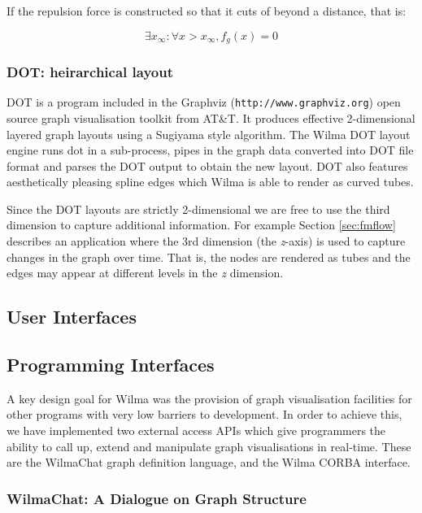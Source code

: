 \documentclass[runningheads]{cl2emult}
\newcommand{\url}[1]{{\small{\tt #1}}}
\begin{document}
If the repulsion force is constructed so that it cuts of beyond a distance,
that is:

\begin{equation}
\exists x_\infty : \forall x > x_\infty, f_g(x) = 0
\end{equation}

\subsubsection{DOT: heirarchical layout}
DOT is a program included in the Graphviz
(\url{http://www.graphviz.org}) open source graph visualisation
toolkit from AT\&T.  It produces effective 2-dimensional layered graph
layouts using a Sugiyama\cite{Sugiyama81methods} style algorithm.
The Wilma DOT layout engine runs dot in a sub-process, pipes in the graph
data converted into DOT file format and parses the DOT output to
obtain the new layout.
DOT also features aesthetically pleasing spline edges which Wilma
is able to render as curved tubes.

Since the DOT layouts are strictly 2-dimensional we are free to use the
third dimension to capture additional information.  For example
Section \ref{sec:fmflow} describes an application where the 3rd
dimension (the {\em z}-axis) is used to capture changes in the graph over time.
That is, the nodes are rendered as tubes and the edges may appear at different
levels in the {\em z} dimension.

\subsection{User Interfaces}
\subsection{Programming Interfaces}
\label{API}

A key design goal for Wilma was the provision of graph visualisation
facilities for other programs with very low barriers to development.  In order
to achieve this, we have implemented two external access APIs which give
programmers the ability to call up, extend and manipulate graph visualisations
in real-time.  These are the WilmaChat graph definition language, and the
Wilma CORBA interface.

\subsubsection{WilmaChat: A Dialogue on Graph Structure}
\end{document}
